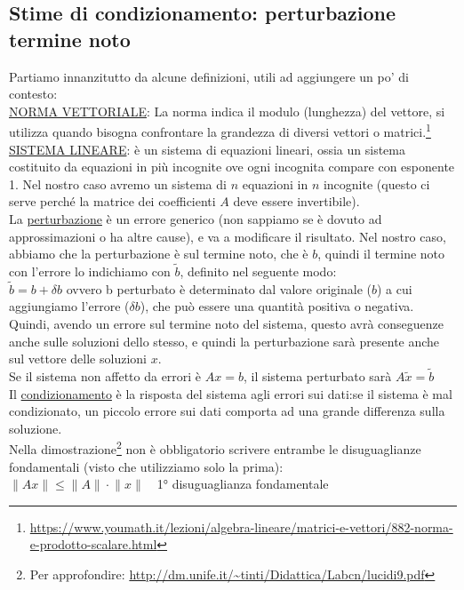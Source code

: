\subsection{Stime di condizionamento: perturbazione termine noto} 
Partiamo innanzitutto da alcune definizioni, utili ad aggiungere un po' di contesto:\\
\underline{NORMA VETTORIALE}: La norma indica il modulo (lunghezza) del vettore, si utilizza quando bisogna confrontare la grandezza di diversi vettori o matrici.\footnote[3]{\url{https://www.youmath.it/lezioni/algebra-lineare/matrici-e-vettori/882-norma-e-prodotto-scalare.html}}\\
\underline{SISTEMA LINEARE}: è un sistema di equazioni lineari, ossia un sistema costituito da equazioni in più incognite ove ogni incognita compare con esponente 1. Nel nostro caso avremo un sistema di $n$ equazioni in $n$ incognite (questo ci serve perché la matrice dei coefficienti $A$ deve essere invertibile).\\
La \underline{perturbazione} è un errore generico (non sappiamo se è dovuto ad approssimazioni o ha altre cause), e va a modificare il risultato. Nel nostro caso, abbiamo che la perturbazione è sul termine noto, che è $b$, quindi il termine noto con l'errore lo indichiamo con $\tilde{b}$, definito nel seguente modo:\\
$\tilde{b}=b+\delta b$ ovvero b perturbato è determinato dal valore originale ($b$) a cui aggiungiamo l'errore ($\delta b$), che può essere una quantità positiva o negativa.\\
Quindi, avendo un errore sul termine noto del sistema, questo avrà conseguenze anche sulle soluzioni dello stesso, e quindi la perturbazione sarà presente anche sul vettore delle soluzioni $x$.\\
Se il sistema non affetto da errori è $Ax=b$, il sistema perturbato sarà $A\tilde{x}=\tilde{b}$\\
Il \underline{condizionamento} è la risposta del sistema agli errori sui dati:se il sistema è mal condizionato, un piccolo errore sui dati comporta ad una grande differenza sulla soluzione.\\
Nella dimostrazione\footnote[4]{Per approfondire: \url{http://dm.unife.it/~tinti/Didattica/Labcn/lucidi9.pdf}} non è obbligatorio scrivere entrambe le disuguaglianze fondamentali (visto che utilizziamo solo la prima):\\
$\lVert Ax \rVert \leq \lVert A \rVert \cdot \lVert x \rVert \quad $1° disuguaglianza fondamentale\\
